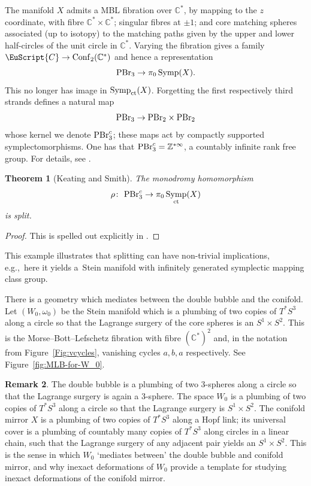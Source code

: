 \documentclass[10pt,a4paper]{amsart}
\newcommand{\scrC}{\EuScript{C}}
\DeclareMathOperator{\Symp}{Symp}
\def\bZ{\mathbb{Z}}
\def\bC{\mathbb{C}}
\newtheorem{thm}{Theorem}[section]
\theoremstyle{definition}
\newtheorem{rmk}[thm]{Remark}
\numberwithin{equation}{section}
\begin{document}
The manifold $X$ admits a MBL fibration over $\bC^*$, by mapping to the $z$ coordinate, with fibre $\bC^*\times \bC^*$; singular fibres at $\pm1$; and core matching spheres associated (up to isotopy) to the matching paths given by the upper and lower half-circles of the unit circle in $\bC^\ast$. Varying the fibration gives a family $\scrC \to \mathrm{Conf}_2(\bC^*)$ and hence a representation
\[
{\rm PBr}_3 \to \pi_0\Symp(X).
\]
This no longer has image in $\Symp_{\rm ct}(X)$. Forgetting the first respectively third strands defines a natural map
\[
{\rm PBr}_3 \to {\rm PBr}_2 \times {\rm PBr}_2
\]
whose kernel we denote ${\rm PBr}_3^c$; these maps act by compactly supported symplectomorphisms. One has that ${\rm PBr}_3^c = \bZ^{\ast \infty}$, a countably infinite rank free group. For details, see \cite[Section 3]{Keating-Smith}.

\begin{thm}[Keating and Smith]
The monodromy homomorphism
\[
\rho\colon \ {\rm PBr}_3^c \to \pi_0\Symp_{\rm ct}(X)
\]
is split.
\end{thm}

\begin{proof} This is spelled out explicitly in \cite[Theorem 1.1]{Keating-Smith}. \end{proof}

This example illustrates that splitting can have non-trivial implications, e.g.,~here it yields a~Stein manifold with infinitely generated symplectic mapping class group.

There is a geometry which mediates between the double bubble and the conifold. Let $(W_0,\omega_0)$ be the Stein manifold which is a plumbing of two copies of $T^*S^3$ along a circle so that the Lagrange surgery of the core spheres is an $S^1\times S^2$. This is the Morse--Bott--Lefschetz fibration with fibre $(\bC^*)^2$ and, in the notation from Figure~\ref{Fig:vcycles}, vanishing cycles $a,b,a$ respectively. See Figure~\ref{fig:MLB-for-W_0}.


\begin{rmk}
 The double bubble is a plumbing of two 3-spheres along a circle so that the Lagrange surgery is again a 3-sphere. The space $W_0$ is a plumbing of two copies of $T^*S^3$ along a circle so that the Lagrange surgery is $S^1\times S^2$. The conifold mirror $X$ is a plumbing of two copies of $T^*S^3$ along a Hopf link; its universal cover is a plumbing of countably many copies of $T^*S^3$ along circles in a linear chain, such that the Lagrange surgery of any adjacent pair yields an $S^1\times S^2$. This is the sense in which $W_0$ `mediates between' the double bubble and conifold mirror, and why inexact deformations of $W_0$ provide a template for studying inexact deformations of the conifold mirror.
\end{rmk}
\end{document}
